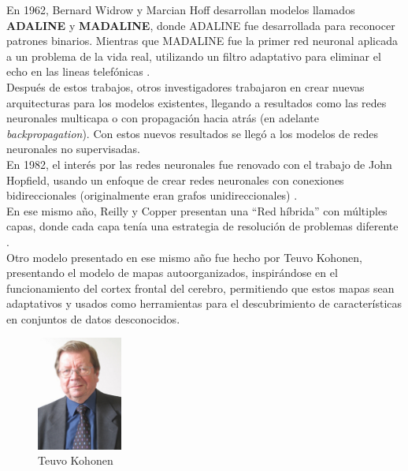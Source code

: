 En 1962, Bernard Widrow y Marcian Hoff desarrollan modelos llamados
\textbf{ADALINE} y \textbf{MADALINE}, donde ADALINE fue desarrollada
para reconocer patrones binarios. Mientras que MADALINE fue la primer
red neuronal aplicada a un problema de la vida real, utilizando un
filtro adaptativo para eliminar el echo en las lineas telefónicas
\cite{widrow1962associative, widrow1960adaptive}.\\

Después de estos trabajos, otros investigadores trabajaron en crear
nuevas arquitecturas para los modelos existentes, llegando a
resultados como las redes neuronales multicapa o con propagación hacia
atrás (en adelante \textit{backpropagation}). Con estos nuevos
resultados se llegó a los modelos de redes neuronales no
supervisadas.\\

En 1982, el interés por las redes neuronales fue renovado con el
trabajo de John Hopfield, usando un enfoque de crear redes neuronales
con conexiones bidireccionales (originalmente eran grafos
unidireccionales) \cite{hopfield1982neural}.\\

En ese mismo año, Reilly y Copper presentan una ``Red híbrida'' con
múltiples capas, donde cada capa tenía una estrategia de resolución de
problemas diferente \cite{reilly1982neural}.\\

Otro modelo presentado en ese mismo año fue hecho por Teuvo Kohonen,
presentando el modelo de mapas autoorganizados, inspirándose en el
funcionamiento del cortex frontal del cerebro, permitiendo que estos
mapas sean adaptativos y usados como herramientas para el
descubrimiento de características en conjuntos de datos
desconocidos\cite{kohonen1982som, Kohonen2001}.\\

\begin{figure}
    \centering
    \includegraphics[width=0.25\textwidth]{teuvo}
    \caption{Teuvo Kohonen}
    \label{fig:turing}
\end{figure}


